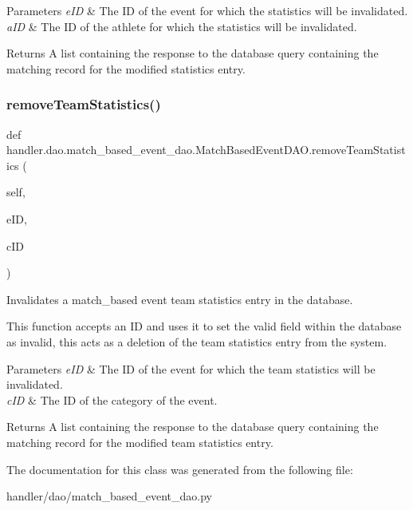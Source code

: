 \begin{DoxyParams}{Parameters}
{\em e\+ID} & The ID of the event for which the statistics will be invalidated. \\
\hline
{\em a\+ID} & The ID of the athlete for which the statistics will be invalidated.\\
\hline
\end{DoxyParams}
\begin{DoxyReturn}{Returns}
A list containing the response to the database query containing the matching record for the modified statistics entry. 
\end{DoxyReturn}
\mbox{\label{classhandler_1_1dao_1_1match__based__event__dao_1_1_match_based_event_d_a_o_aee8505c4896c85c2517d003ffd129987}} 
\subsubsection{\texorpdfstring{remove\+Team\+Statistics()}{removeTeamStatistics()}}
{\footnotesize\ttfamily def handler.\+dao.\+match\+\_\+based\+\_\+event\+\_\+dao.\+Match\+Based\+Event\+D\+A\+O.\+remove\+Team\+Statistics (\begin{DoxyParamCaption}\item[{}]{self,  }\item[{}]{e\+ID,  }\item[{}]{c\+ID }\end{DoxyParamCaption})}



Invalidates a match\+\_\+based event team statistics entry in the database. 

This function accepts an ID and uses it to set the valid field within the database as invalid, this acts as a deletion of the team statistics entry from the system.


\begin{DoxyParams}{Parameters}
{\em e\+ID} & The ID of the event for which the team statistics will be invalidated. \\
\hline
{\em c\+ID} & The ID of the category of the event.\\
\hline
\end{DoxyParams}
\begin{DoxyReturn}{Returns}
A list containing the response to the database query containing the matching record for the modified team statistics entry. 
\end{DoxyReturn}


The documentation for this class was generated from the following file\+:\begin{DoxyCompactItemize}
\item 
handler/dao/match\+\_\+based\+\_\+event\+\_\+dao.\+py\end{DoxyCompactItemize}
